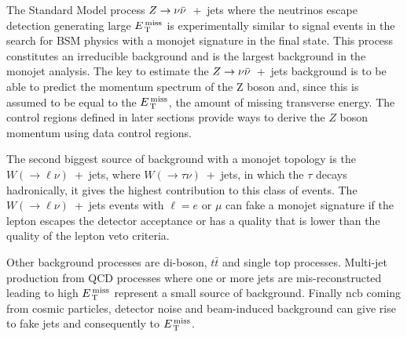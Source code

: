 The Standard Model process $Z \rightarrow \nu \bar{\nu}$~+~jets where the neutrinos escape detection
generating large $E_\mathrm{\, T}^\mathrm{\, miss}$ is experimentally similar to signal events in the search
for BSM physics with a monojet signature in the final state. This process
constitutes an irreducible background and is the largest background in the
monojet analysis. The key to estimate the $Z \rightarrow \nu \bar{\nu}$~+~jets background is to be
able to predict the momentum spectrum of the Z boson and, since this is assumed
to be equal to the $E_\mathrm{\, T}^\mathrm{\, miss}$, the amount of missing transverse energy. The control
regions defined in later sections provide ways to derive the $Z$ boson momentum
using data control regions.

The second biggest source of background with a monojet topology is the
$W (\rightarrow \ell \nu)$~+~jets, where $W (\rightarrow \tau \nu)$~+~jets, in
which the $\tau$ decays hadronically, it gives the highest contribution to this
class of events. The $W (\rightarrow \ell \nu)$~+~jets events with $\ell = e$ or
$\mu$ can fake a monojet signature if the lepton escapes the detector acceptance
or has a quality that is lower than the quality of the lepton veto criteria.

Other background processes are di-boson, $t \bar{t}$ and single top
processes. Multi-jet production from QCD processes where one or more jets are
mis-reconstructed leading to high $E_\mathrm{\, T}^\mathrm{\, miss}$ represent a small source of
background. Finally \gls{ncb} coming from cosmic particles, detector noise and
beam-induced background can give rise to fake jets and consequently to $E_\mathrm{\, T}^\mathrm{\, miss}$.
